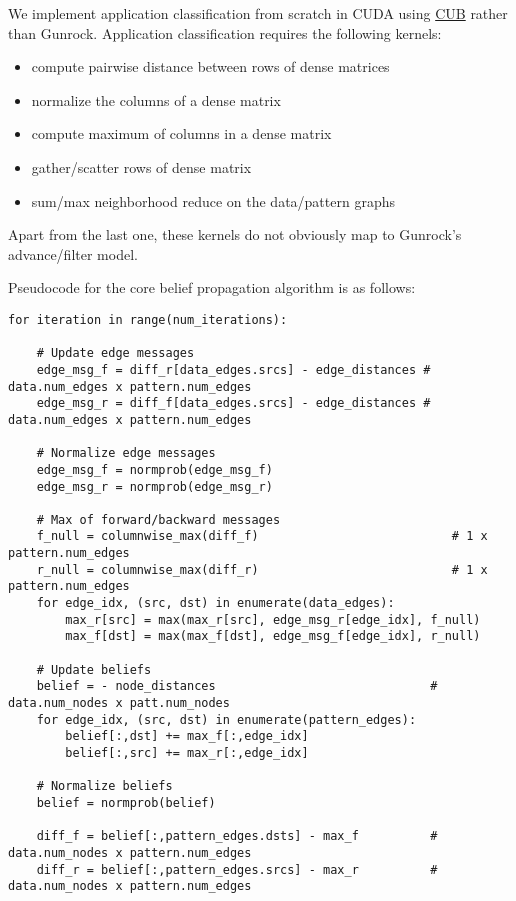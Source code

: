 \documentclass[10pt,oneside]{memoir}
\providecommand{\tightlist}{%
  \setlength{\itemsep}{0pt}\setlength{\parskip}{0pt}}
\begin{document}
We implement application classification from scratch in CUDA using
\href{https://nvlabs.github.io/cub/}{CUB} rather than Gunrock.
Application classification requires the following kernels:

\begin{itemize}
\tightlist
\item
  compute pairwise distance between rows of dense matrices
\item
  normalize the columns of a dense matrix
\item
  compute maximum of columns in a dense matrix
\item
  gather/scatter rows of dense matrix
\item
  sum/max neighborhood reduce on the data/pattern graphs
\end{itemize}

Apart from the last one, these kernels do not obviously map to Gunrock's
advance/filter model.

Pseudocode for the core belief propagation algorithm is as follows:

\begin{verbatim}
for iteration in range(num_iterations):

    # Update edge messages
    edge_msg_f = diff_r[data_edges.srcs] - edge_distances # data.num_edges x pattern.num_edges
    edge_msg_r = diff_f[data_edges.srcs] - edge_distances # data.num_edges x pattern.num_edges

    # Normalize edge messages
    edge_msg_f = normprob(edge_msg_f)
    edge_msg_r = normprob(edge_msg_r)

    # Max of forward/backward messages
    f_null = columnwise_max(diff_f)                           # 1 x pattern.num_edges
    r_null = columnwise_max(diff_r)                           # 1 x pattern.num_edges
    for edge_idx, (src, dst) in enumerate(data_edges):
        max_r[src] = max(max_r[src], edge_msg_r[edge_idx], f_null)
        max_f[dst] = max(max_f[dst], edge_msg_f[edge_idx], r_null)

    # Update beliefs
    belief = - node_distances                              # data.num_nodes x patt.num_nodes
    for edge_idx, (src, dst) in enumerate(pattern_edges):
        belief[:,dst] += max_f[:,edge_idx]
        belief[:,src] += max_r[:,edge_idx]

    # Normalize beliefs
    belief = normprob(belief)

    diff_f = belief[:,pattern_edges.dsts] - max_f          # data.num_nodes x pattern.num_edges
    diff_r = belief[:,pattern_edges.srcs] - max_r          # data.num_nodes x pattern.num_edges
\end{verbatim}
\end{document}

